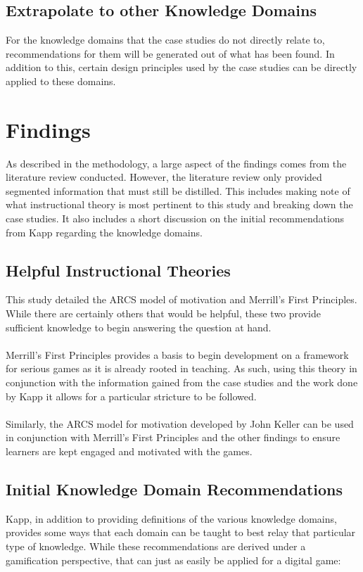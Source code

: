 \documentclass[conference]{IEEEtran}
\begin{document}
\subsection{Extrapolate to other Knowledge Domains}
For the knowledge domains that the case studies do not directly relate to, recommendations for them will be generated out of what has been found. In addition to this, certain design principles used by the case studies can be directly applied to these domains.

\section{Findings}
As described in the methodology, a large aspect of the findings comes from the literature review conducted. However, the literature review only provided segmented information that must still be distilled. This includes making note of what instructional theory is most pertinent to this study and breaking down the case studies. It also includes a short discussion on the initial recommendations from Kapp\cite{Kapp2012a} regarding the knowledge domains.

\subsection{Helpful Instructional Theories}
This study detailed the ARCS model of motivation and Merrill's First Principles. While there are certainly others that would be helpful, these two provide sufficient knowledge to begin answering the question at hand. 
\\\\
Merrill's First Principles\cite{Merrill2002} provides a basis to begin development on a framework for serious games as it is already rooted in teaching. As such, using this theory in conjunction with the information gained from the case studies and the work done by Kapp\cite{Kapp2012a} it allows for a particular stricture to be followed.
\\\\
Similarly, the ARCS model for motivation developed by John Keller\cite{keller1987development} can be used in conjunction with Merrill's First Principles and the other findings to ensure learners are kept engaged and motivated with the games.

\subsection{Initial Knowledge Domain Recommendations}
Kapp\cite{Kapp2012a}, in addition to providing definitions of the various knowledge domains, provides some ways that each domain can be taught to best relay that particular type of knowledge. While these recommendations are derived under a gamification perspective\cite{Kapp2012a}, that can just as easily be applied for a digital game:
\end{document}
